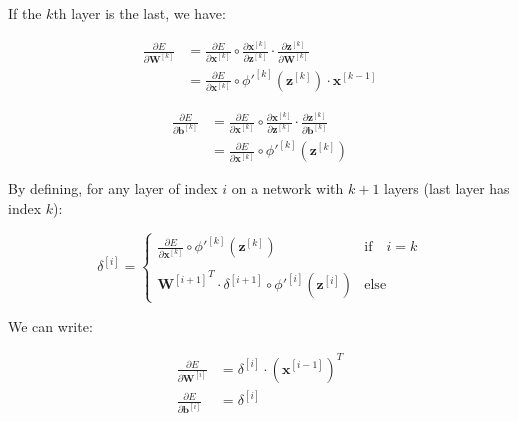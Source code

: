 \documentclass[12pt]{article}
\begin{document}
\begin{enumerate}[leftmargin=\labelsep]
    If the $k$th layer is the last, we have:

    \begin{equation}
    \begin{aligned}
        \frac{\partial E}{\partial \mathbf{W}^{[k]}} &= \frac{\partial E}{\partial \mathbf{x}^{[k]}} \circ \frac{\partial \mathbf{x}^{[k]}}{\partial \mathbf{z}^{[k]}} \cdot \frac{\partial \mathbf{z}^{[k]}}{\partial \mathbf{W}^{[k]}} \\
        &= \frac{\partial E}{\partial \mathbf{x}^{[k]}} \circ \phi'^{[k]}(\mathbf{z}^{[k]}) \cdot \mathbf{x}^{[k-1]}
    \end{aligned}
    \end{equation}

    \begin{equation}
    \begin{aligned}
        \frac{\partial E}{\partial \mathbf{b}^{[k]}} &= \frac{\partial E}{\partial \mathbf{x}^{[k]}} \circ \frac{\partial \mathbf{x}^{[k]}}{\partial \mathbf{z}^{[k]}} \cdot \frac{\partial \mathbf{z}^{[k]}}{\partial \mathbf{b}^{[k]}} \\
        &= \frac{\partial E}{\partial \mathbf{x}^{[k]}} \circ \phi'^{[k]}(\mathbf{z}^{[k]})
    \end{aligned}
    \end{equation}

    By defining, for any layer of index $i$ on a network with $k+1$ layers (last layer has index $k$):

    \begin{equation}
        \delta^{[i]} = \left\{
        \begin{array}{ll}
            \frac{\partial E}{\partial \mathbf{x}^{[k]}} \circ \phi'^{[k]}(\mathbf{z}^{[k]}) & \textrm{if} \quad i = k \\
            \\
            {\mathbf{W}^{[i+1]}}^T \cdot \delta^{[i+1]} \circ \phi'^{[i]}(\mathbf{z}^{[i]})  & \textrm{else}
        \end{array} 
        \right.
    \end{equation}

    We can write:

    \begin{equation}
    \begin{aligned}
        \frac{\partial E}{\partial \mathbf{W}^{[i]}} &= \delta^{[i]} \cdot {(\mathbf{x}^{[i-1]})}^T \\
        \frac{\partial E}{\partial \mathbf{b}^{[i]}} &= \delta^{[i]} \\
    \end{aligned}
    \end{equation}


\end{enumerate}
\end{document}
